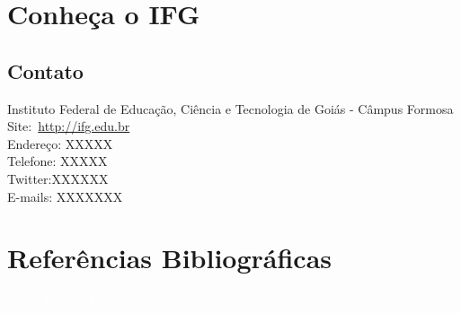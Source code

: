 \documentclass[11pt,fleqn]{book} %
\begin{document}
\chapter*{Conheça o IFG}
\vspace{6em}
\begin{flushright}
\end{flushright}
\vspace{12em}

\section{Contato}

Instituto Federal de Educação, Ciência e Tecnologia de Goiás - Câmpus Formosa\\
Site:~\url{http://ifg.edu.br}\\
Endereço: XXXXX\\
Telefone: XXXXX \\
Twitter:XXXXXX \\
E-mails: XXXXXXX





%

\chapter*{Referências Bibliográficas}
\vspace{6em}
\begin{flushright}
	\textit{\textcolor{white}{Foto: Adriano Darosci}}
\end{flushright}
\vspace{12em}
\printbibliography[heading=bibempty]
\end{document}
